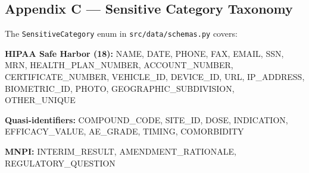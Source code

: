 \begin{Shaded}
\begin{Highlighting}[]

 




\end{Highlighting}
\end{Shaded}

\subsection{Appendix C --- Sensitive Category
Taxonomy}\label{appendix-c-sensitive-category-taxonomy}

The \texttt{SensitiveCategory} enum in \texttt{src/data/schemas.py}
covers:

\textbf{HIPAA Safe Harbor (18):} NAME, DATE, PHONE, FAX, EMAIL, SSN,
MRN, HEALTH\_PLAN\_NUMBER, ACCOUNT\_NUMBER, CERTIFICATE\_NUMBER,
VEHICLE\_ID, DEVICE\_ID, URL, IP\_ADDRESS, BIOMETRIC\_ID, PHOTO,
GEOGRAPHIC\_SUBDIVISION, OTHER\_UNIQUE

\textbf{Quasi-identifiers:} COMPOUND\_CODE, SITE\_ID, DOSE, INDICATION,
EFFICACY\_VALUE, AE\_GRADE, TIMING, COMORBIDITY

\textbf{MNPI:} INTERIM\_RESULT, AMENDMENT\_RATIONALE,
REGULATORY\_QUESTION

